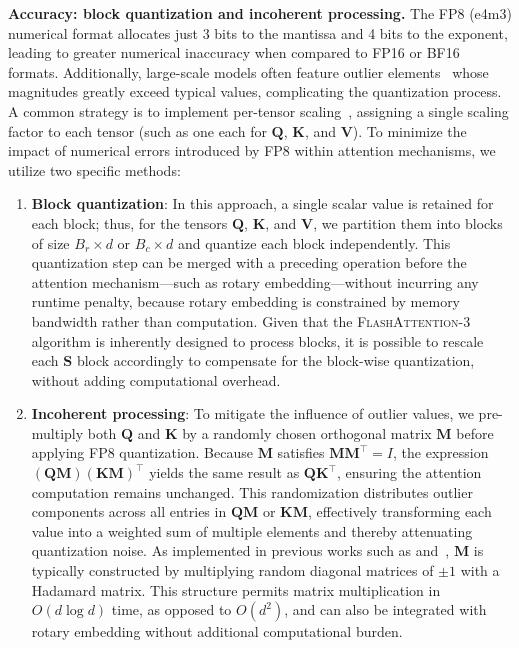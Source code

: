 \begin{algorithm}[H]
\begin{algorithmic}[1]
\textbf{Accuracy: block quantization and incoherent processing.} The FP8 (e4m3) numerical format allocates just 3 bits to the mantissa and 4 bits to the exponent, leading to greater numerical inaccuracy when compared to FP16 or BF16 formats. Additionally, large-scale models often feature outlier elements~\citep{dettmers2208llm, sun2024massive} whose magnitudes greatly exceed typical values, complicating the quantization process. A common strategy is to implement per-tensor scaling~\citep{micikevicius2022fp8}, assigning a single scaling factor to each tensor (such as one each for $\mathbf{Q}$, $\mathbf{K}$, and $\mathbf{V}$). To minimize the impact of numerical errors introduced by FP8 within attention mechanisms, we utilize two specific methods:

\begin{enumerate}

\item \textbf{Block quantization}: In this approach, a single scalar value is retained for each block; thus, for the tensors $\mathbf{Q}$, $\mathbf{K}$, and $\mathbf{V}$, we partition them into blocks of size $B_r \times d$ or $B_c \times d$ and quantize each block independently. This quantization step can be merged with a preceding operation before the attention mechanism—such as rotary embedding—without incurring any runtime penalty, because rotary embedding is constrained by memory bandwidth rather than computation. Given that the \textsc{FlashAttention-3} algorithm is inherently designed to process blocks, it is possible to rescale each $\mathbf{S}$ block accordingly to compensate for the block-wise quantization, without adding computational overhead.

\item \textbf{Incoherent processing}: To mitigate the influence of outlier values, we pre-multiply both $\mathbf{Q}$ and $\mathbf{K}$ by a randomly chosen orthogonal matrix $\mathbf{M}$ before applying FP8 quantization. Because $\mathbf{M}$ satisfies $\mathbf{M} \mathbf{M}^\top = I$, the expression $(\mathbf{Q} \mathbf{M}) (\mathbf{K} \mathbf{M})^\top$ yields the same result as $\mathbf{Q} \mathbf{K}^\top$, ensuring the attention computation remains unchanged. This randomization distributes outlier components across all entries in $\mathbf{Q} \mathbf{M}$ or $\mathbf{K} \mathbf{M}$, effectively transforming each value into a weighted sum of multiple elements and thereby attenuating quantization noise. As implemented in previous works such as \citet{chee2024quip} and~\citet{tseng2024quip}, $\mathbf{M}$ is typically constructed by multiplying random diagonal matrices of $\pm 1$ with a Hadamard matrix. This structure permits matrix multiplication in $O(d \log d)$ time, as opposed to $O(d^2)$, and can also be integrated with rotary embedding without additional computational burden.
\end{enumerate}


\end{algorithmic}
\end{algorithm}
